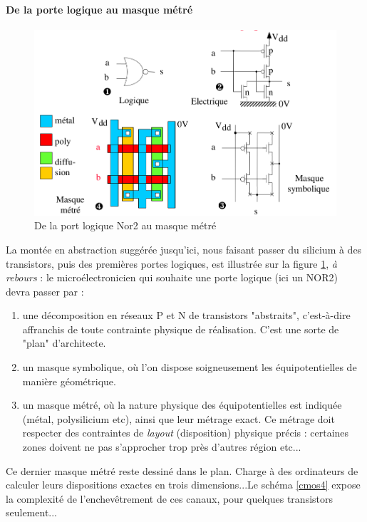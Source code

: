 \paragraph{De la porte logique au masque métré}
\begin{figure}[htb]
  \begin{center}
    \includegraphics[scale=0.4]{figures/vues_4.png}
    \caption{De la port logique Nor2 au masque métré}
  \label{vues}
  \end{center}
\end{figure}

La montée en abstraction suggérée jusqu'ici, nous faisant passer du silicium à des transistors, puis des premières portes logiques, est illustrée sur la figure \ref{vues}, {\it à rebours} :
le microélectronicien qui souhaite une porte logique (ici un NOR2) devra passer par :
\begin{enumerate}
  \item une décomposition en réseaux P et N de transistors "abstraits", c'est-à-dire affranchis de toute contrainte physique de réalisation. C'est une  sorte de "plan" d'architecte.
  \item un masque symbolique, où l'on dispose soigneusement les équipotentielles de manière géométrique.
  \item un masque métré, où la nature physique des équipotentielles est indiquée (métal, polysilicium etc), ainsi que leur métrage exact. Ce métrage doit respecter des contraintes de {\it layout} (disposition)
  physique précis : certaines zones doivent ne pas s'approcher trop près d'autres région etc...
\end{enumerate}

Ce dernier masque métré reste dessiné dans le plan. Charge à des ordinateurs de calculer leurs dispositions exactes en trois dimensions...Le schéma \ref{cmos4} expose la complexité de
l'enchevêtrement de ces canaux, pour quelques transistors seulement...

